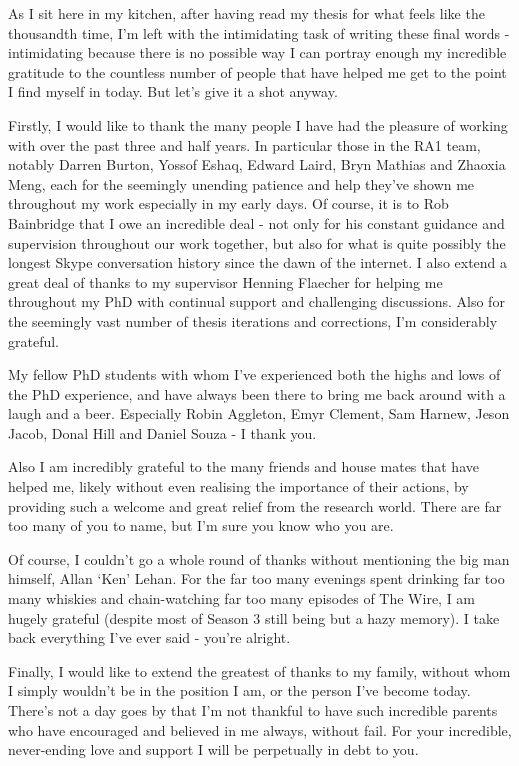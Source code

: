 
\begin{acknowledgements}      

\begin{spacing}{1}
As I sit here in my kitchen, after having read my thesis for what feels like
the
thousandth time, I'm left with the intimidating task of writing these final
words - intimidating because there is no possible way I can portray enough my
incredible gratitude to the countless number of people that have helped me
get to the point I find myself in today. But let's give it a shot anyway.

Firstly, I would like to thank the many people I have had the pleasure of
working with
over the past three and half years. In particular those in
the RA1 team, notably Darren Burton, Yossof Eshaq, Edward
Laird, Bryn Mathias and Zhaoxia Meng, each for the seemingly unending patience
and help
they've shown me throughout my work especially in my early days. Of course, it
is to Rob Bainbridge that I
owe an incredible deal - not only for his constant guidance and supervision
throughout our work together, but also for what is quite possibly the longest
Skype conversation history since the dawn of the internet.
I also extend a great deal of thanks to my supervisor Henning Flaecher for
helping me throughout my PhD with continual support and challenging discussions.
Also for the seemingly vast number of thesis iterations and corrections, I'm
considerably grateful.

My fellow PhD students with whom I've experienced both the highs and lows of
the PhD experience, and have always been there to bring me back around with a
laugh
and a beer. Especially Robin Aggleton, Emyr Clement, Sam Harnew, Jeson Jacob,
Donal Hill
and Daniel Souza - I thank you.

Also I am incredibly grateful to the many friends and house mates that have
helped me, likely without even realising the importance of their actions, by
providing such a welcome and great relief from the research world. There are
far too many of you to name, but I'm sure you know who you are.

Of course, I couldn't go a whole round of thanks without mentioning the big man
himself, Allan `Ken' Lehan. For the far too many evenings spent
drinking far too many whiskies and chain-watching far too many episodes of The
Wire, I am hugely grateful (despite most of Season 3 still being but a hazy
memory). I take back everything I've ever said - you're alright.

Finally, I would like to extend the greatest of thanks to my family, without whom
I simply wouldn't be in the position I am, or the person I've become today.
There's not a day goes by that I'm not thankful to have such incredible parents
who have encouraged and believed in me always, without fail.
For your incredible, never-ending love and support I will be perpetually in debt
to you.
\end{spacing}

\end{acknowledgements}


